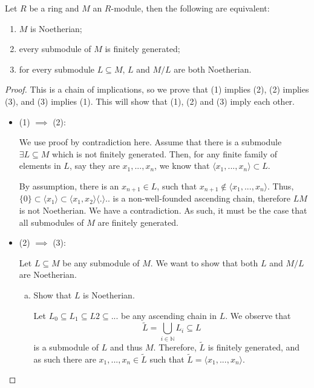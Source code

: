 \documentclass[12pt, a4paper, titlepage]{report}
\newcommand\dangle[1]{\langle {#1} \rangle}
\begin{document}
\begin{lem}
  Let $R$ be a ring and $M$ an $R$-module, then the following are equivalent:

  \begin{enumerate}[(1)]
  \item $M$ is Noetherian;
  \item every submodule of $M$ is finitely generated;
  \item for every submodule $L \subseteq M$, $L$ and $M/L$ are both Noetherian.
  \end{enumerate}
\end{lem}

\begin{proof}
  This is a chain of implications, so we prove that (1) implies (2), (2) implies (3), and (3) implies (1).
  This will show that (1), (2) and (3) imply each other.

  \begin{itemize}
  \item (1) $\implies$ (2):

    We use proof by contradiction here. Assume that there is a submodule $\exists L \subseteq M$ which
    is not finitely generated. Then, for any finite family of elements in $L$, say they are
    $x_1, ..., x_n$, we know that $\dangle{x_1, ..., x_n} \subset L$.

    By assumption, there is an $x_{n+1} \in L$, such that $x_{n+1} \notin \dangle{x_1, ..., x_n}$.
    Thus, $\{0\} \subset \dangle{x_1} \subset \dangle{x_1, x_2} \dangle ...$ is a non-well-founded
    ascending chain, therefore $LM$ is not Noetherian. We have a contradiction. As such, it must be the
    case that all submodules of $M$ are finitely generated.

  \item (2) $\implies$ (3):

    Let $L \subseteq M$ be any submodule of $M$. We want to show that both $L$ and $M/L$ are Noetherian.

    \begin{enumerate}[(a)]
    \item Show that $L$ is Noetherian.
      
      Let $L_0 \subseteq L_1 \subseteq L2 \subseteq ...$ be any
      ascending chain in $L$. We observe that
      \[
        \widetilde{L} = \bigcup\limits_{i \in \mathbb{N}} L_i \subseteq L
      \]
      is a submodule of $L$ and thus $M$. Therefore, $\widetilde{L}$ is finitely generated, and as such there are
      $x_1, ..., x_n \in \widetilde{L}$ such that $\widetilde{L} = \dangle{x_1, ..., x_n}$.
      

\end{enumerate}
\end{itemize}
\end{proof}
\end{document}
